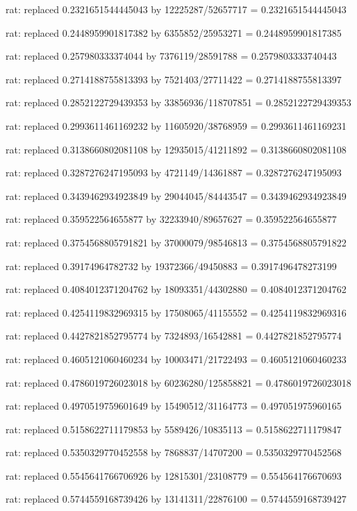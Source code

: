 \documentclass[a4paper,10pt]{article}
\begin{document}
\begin{eulernotebook}
\begin{eulercomment}
\begin{eulercomment}
\begin{eulercomment}
\begin{eulercomment}
\begin{eulercomment}
\begin{eulercomment}
\begin{eulercomment}
\begin{eulercomment}
\begin{eulercomment}
\begin{eulercomment}
\begin{eulercomment}
\begin{eulercomment}
\begin{eulercomment}
\begin{eulercomment}
\begin{eulercomment}
\begin{eulercomment}
\begin{euleroutput}
  rat: replaced 0.2321651544445043 by 12225287/52657717 = 0.2321651544445043
  
  rat: replaced 0.2448959901817382 by 6355852/25953271 = 0.2448959901817385
  
  rat: replaced 0.257980333374044 by 7376119/28591788 = 0.2579803333740443
  
  rat: replaced 0.2714188755813393 by 7521403/27711422 = 0.2714188755813397
  
  rat: replaced 0.2852122729439353 by 33856936/118707851 = 0.2852122729439353
  
  rat: replaced 0.2993611461169232 by 11605920/38768959 = 0.2993611461169231
  
  rat: replaced 0.3138660802081108 by 12935015/41211892 = 0.3138660802081108
  
  rat: replaced 0.3287276247195093 by 4721149/14361887 = 0.3287276247195093
  
  rat: replaced 0.3439462934923849 by 29044045/84443547 = 0.3439462934923849
  
  rat: replaced 0.359522564655877 by 32233940/89657627 = 0.359522564655877
  
  rat: replaced 0.3754568805791821 by 37000079/98546813 = 0.3754568805791822
  
  rat: replaced 0.39174964782732 by 19372366/49450883 = 0.3917496478273199
  
  rat: replaced 0.4084012371204762 by 18093351/44302880 = 0.4084012371204762
  
  rat: replaced 0.4254119832969315 by 17508065/41155552 = 0.4254119832969316
  
  rat: replaced 0.4427821852795774 by 7324893/16542881 = 0.4427821852795774
  
  rat: replaced 0.4605121060460234 by 10003471/21722493 = 0.4605121060460233
  
  rat: replaced 0.4786019726023018 by 60236280/125858821 = 0.4786019726023018
  
  rat: replaced 0.4970519759601649 by 15490512/31164773 = 0.497051975960165
  
  rat: replaced 0.5158622711179853 by 5589426/10835113 = 0.5158622711179847
  
  rat: replaced 0.5350329770452558 by 7868837/14707200 = 0.5350329770452568
  
  rat: replaced 0.5545641766706926 by 12815301/23108779 = 0.554564176670693
  
  rat: replaced 0.5744559168739426 by 13141311/22876100 = 0.5744559168739427
  

\end{euleroutput}
\end{eulercomment}
\end{eulercomment}
\end{eulercomment}
\end{eulercomment}
\end{eulercomment}
\end{eulercomment}
\end{eulercomment}
\end{eulercomment}
\end{eulercomment}
\end{eulercomment}
\end{eulercomment}
\end{eulercomment}
\end{eulercomment}
\end{eulercomment}
\end{eulercomment}
\end{eulercomment}
\end{eulernotebook}
\end{document}
